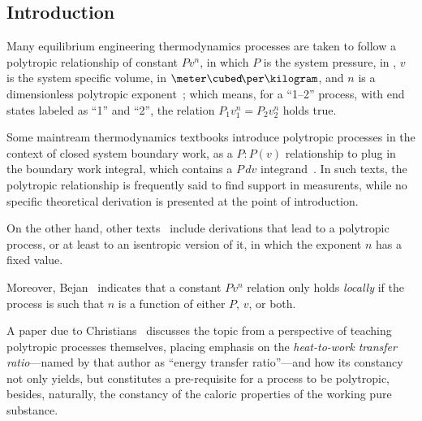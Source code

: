 \documentclass[10pt,a4paper]{article}
\begin{document}
\begin{multicols*}{2}

\section{Introduction}

    Many equilibrium engineering thermodynamics processes  are  taken  to  follow  a  polytropic
    relationship of constant $Pv^n$, in which $P$ is the system pressure, in  \kilo\pascal,  $v$
    is the system specific volume, in $\meter\cubed\!\per\kilogram$, and $n$ is a  dimensionless
    polytropic exponent~\cite{2013-CengelYA+BolesMA-AMGH}; which means, for a ``1--2''  process,
    with end states labeled as ``1'' and ``2'', the relation $P_1v_1^n = P_2v_2^n$ holds true.

    Some maintream thermodynamics textbooks introduce polytropic processes  in  the  context  of
    closed system boundary work, as a  $P:P(v)$  relationship  to  plug  in  the  boundary  work
    integral,   which    contains    a    $P\,dv$    integrand~\cite{2013-CengelYA+BolesMA-AMGH,
    2002-MoranMJ+ShapiroHN-LTC, 1985-WylenG-Wiley}. In such texts, the  polytropic  relationship
    is frequently said to find support in measurents, while no specific  theoretical  derivation
    is presented at the point of introduction.

    On  the  other  hand,  other  texts~\cite{1986-JonesJB+HawkinsGA-Wiley,   2006-BejanA-Wiley,
    2015-KroosKA+PotterMC-Cengage} include derivations that lead to a polytropic process, or  at
    least to an isentropic version of it, in which the exponent $n$ has a fixed value.

    Moreover, Bejan~\cite[p.~175]{2006-BejanA-Wiley} indicates that a constant  $Pv^n$  relation
    only holds \emph{locally} if the process is such that $n$ is a function of either $P$,  $v$,
    or both.

    A paper due to Christians~\cite{2012-ChristiansJ-IntJMechEngEduc} discusses the topic from a
    perspective  of  teaching  polytropic  processes  themselves,  placing   emphasis   on   the
    \emph{heat-to-work transfer ratio}---named by that author as ``energy transfer ratio''---and
    how its constancy not only yields, but constitutes a  pre-requisite  for  a  process  to  be
    polytropic, besides, naturally, the constancy of the caloric properties of the working  pure
    substance.


\end{multicols*}
\end{document}
